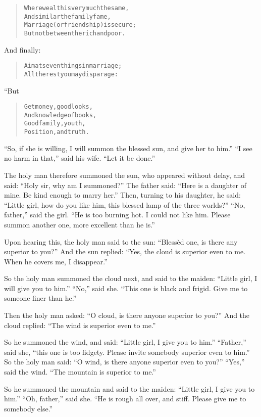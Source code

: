 \documentclass[article, twoside, 14pt]{memoir}
\renewenvironment{verbatim}{%
\begin{quote}%
\vskip -10pt%
\begin{alltt}\normalfont\large}{\end{alltt}%
\end{quote}%
\vskip -10pt
} %
\begin{document}
\begin{verbatim}
Where wealth is very much the same,
And similar the family fame,
Marriage (or friendship) is secure;
But not between the rich and poor.
\end{verbatim}
And finally:

\begin{verbatim}
Aim at seven things in marriage;
All the rest you may disparage:
\end{verbatim}
“But

\begin{verbatim}
Get money, good looks,
And knowledge of books,
Good family, youth,
Position, and truth.
\end{verbatim}
``So, if she is willing, I will summon the blessed sun, and give her to him.''
``I see no harm in that,'' said his wife. ``Let it be done.''

The holy man therefore summoned the sun, who appeared without
delay, and said: ``Holy sir, why am I summoned?'' The father said:
``Here is a daughter of mine. Be kind enough to marry her.''
Then, turning to his daughter, he said:
``Little girl, how do you like him, this blessed lamp of the three worlds?''
``No, father,'' said the girl.
``He is too burning hot. I could not like him. Please summon another one, more excellent than he is.''

Upon hearing this, the holy man said to the sun:
``Blessèd one, is there any superior to you?'' And the sun replied:
``Yes, the cloud is superior even to me. When he covers me, I disappear.''

So the holy man summoned the cloud next, and said to the maiden:
``Little girl, I will give you to him.'' ``No,'' said she.
``This one is black and frigid. Give me to someone finer than he.''

Then the holy man asked:
``O cloud, is there anyone superior to you?'' And the cloud
replied: ``The wind is superior even to me.''

So he summoned the wind, and said:
``Little girl, I give you to him.'' ``Father,'' said she,
``this one is too fidgety. Please invite somebody superior even to him.''
So the holy man said:
``O wind, is there anyone superior even to you?'' ``Yes,'' said the
wind. ``The mountain is superior to me.''

So he summoned the mountain and said to the maiden:
``Little girl, I give you to him.'' ``Oh, father,'' said she.
``He is rough all over, and stiff. Please give me to somebody else.''
\end{document}
